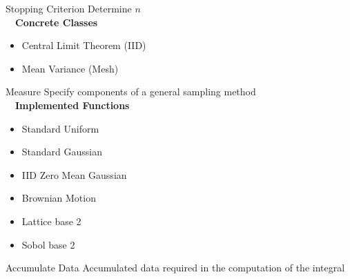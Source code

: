 \documentclass[final]{beamer}
\newlength{\onecolwid}
\newlength{\threecolwid}
\begin{document}
\begin{frame}[t]
\begin{columns}[t]
\begin{column}{\threecolwid}
\begin{columns}[t,totalwidth=\threecolwid]
\begin{column}{\onecolwid}%
\begin{alertblock}{Stopping Criterion}
    Determine $n$ \\[1ex]~\
    \textbf{Concrete Classes}
    \begin{itemize}
        \item Central Limit Theorem (IID)
        \item Mean Variance (Mesh)
    \end{itemize}
\end{alertblock}

\begin{alertblock}{Measure}
    Specify components of a general sampling method \\[1ex]~\
    \textbf{Implemented Functions}
    \begin{itemize}
        \item Standard Uniform
        \item Standard Gaussian
        \item IID Zero Mean Gaussian
        \item Brownian Motion 
        \item Lattice base 2
        \item Sobol base 2
    \end{itemize}
\end{alertblock}

\begin{alertblock}{Accumulate Data}
    Accumulated data required in the computation of the integral
\end{alertblock}
\end{column}
\end{columns}


\end{column}
\end{columns}
\end{frame}
\end{document}
